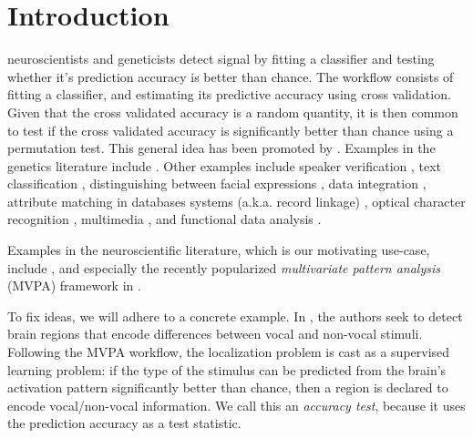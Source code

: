 \documentclass[journal]{IEEEtran}
\begin{document}
%
\IEEEpeerreviewmaketitle



\section{Introduction}
\label{sec:introduction}

 neuroscientists and geneticists detect signal by fitting a classifier and testing whether it's prediction accuracy is better than chance. 
The workflow consists of fitting a classifier, and estimating its predictive accuracy using cross validation.
Given that the cross validated accuracy is a random quantity, it is then common to test if the cross validated accuracy is significantly better than chance using a permutation test.
This general idea has been promoted by \cite{friedman2003multivariate,eric2008testing,ojala_permutation_2010,lopez2016revisiting}.
Examples in the genetics literature include
\cite{golub_molecular_1999,slonim_class_2000,radmacher_paradigm_2002,mukherjee_estimating_2003,juan_prediction_2004,jiang_calculating_2008,yu2007two}.
Other examples include speaker verification \cite{gretton_kernel_2012-1}, 
text classification \cite{dhillon2003divisive,lopez2016revisiting}, distinguishing between facial expressions \cite{lopez2016revisiting}, data integration \cite{gretton_kernel_2012-1}, attribute matching in databases systems (a.k.a. record linkage) \cite{gretton_kernel_2012-1,hall2002permutation,vayatis_auc_2009}, optical character recognition \cite{perez2009estimation}, multimedia \cite{moreno2004kullback}, and functional data analysis \cite{hall2002permutation}.

Examples in the neuroscientific literature, which is our motivating use-case, include \cite{golland_permutation_2003,pereira_machine_2009,schreiber2013statistical,olivetti2013kernel,varoquaux_assessing_2016}, and especially the recently popularized \emph{multivariate pattern analysis} (MVPA) framework in \cite{kriegeskorte_information-based_2006}.

To fix ideas, we will adhere to a concrete example.
In \cite{gilron_quantifying_2016}, the authors seek to detect brain regions that encode differences between vocal and non-vocal stimuli. 
Following the MVPA workflow, the localization problem is cast as a supervised learning problem: if the type of the stimulus can be predicted from the brain's activation pattern significantly better than chance, then a region is declared to encode vocal/non-vocal information. 
We call this an \emph{accuracy test}, because it uses the prediction accuracy as a test statistic. 
\end{document}
